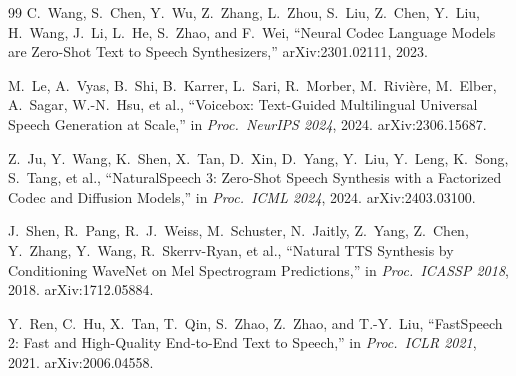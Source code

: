 \documentclass[11pt,a4paper,twocolumn]{article}
\begin{document}
\begin{thebibliography}{99}
C.\ Wang, S.\ Chen, Y.\ Wu, Z.\ Zhang, L.\ Zhou, S.\ Liu,
Z.\ Chen, Y.\ Liu, H.\ Wang, J.\ Li, L.\ He, S.\ Zhao, and F.\ Wei,
``Neural Codec Language Models are Zero-Shot Text to Speech Synthesizers,''
arXiv:2301.02111, 2023.

M.\ Le, A.\ Vyas, B.\ Shi, B.\ Karrer, L.\ Sari, R.\ Morber,
M.\ Rivi\`ere, M.\ Elber, A.\ Sagar, W.-N.\ Hsu, et al.,
``Voicebox: Text-Guided Multilingual Universal Speech Generation at Scale,''
in \textit{Proc.\ NeurIPS 2024}, 2024.
arXiv:2306.15687.

Z.\ Ju, Y.\ Wang, K.\ Shen, X.\ Tan, D.\ Xin, D.\ Yang,
Y.\ Liu, Y.\ Leng, K.\ Song, S.\ Tang, et al.,
``NaturalSpeech 3: Zero-Shot Speech Synthesis with a Factorized
Codec and Diffusion Models,''
in \textit{Proc.\ ICML 2024}, 2024.
arXiv:2403.03100.

J.\ Shen, R.\ Pang, R.\ J.\ Weiss, M.\ Schuster, N.\ Jaitly,
Z.\ Yang, Z.\ Chen, Y.\ Zhang, Y.\ Wang, R.\ Skerrv-Ryan, et al.,
``Natural TTS Synthesis by Conditioning WaveNet on Mel Spectrogram
Predictions,''
in \textit{Proc.\ ICASSP 2018}, 2018.
arXiv:1712.05884.

Y.\ Ren, C.\ Hu, X.\ Tan, T.\ Qin, S.\ Zhao, Z.\ Zhao,
and T.-Y.\ Liu,
``FastSpeech 2: Fast and High-Quality End-to-End Text to Speech,''
in \textit{Proc.\ ICLR 2021}, 2021.
arXiv:2006.04558.

\end{thebibliography}
\end{document}
